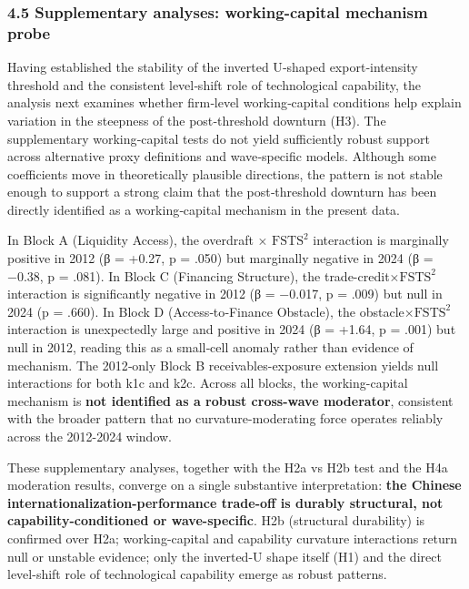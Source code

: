 \documentclass[12pt,a4paper]{article}
\begin{document}
\hypertarget{45-supplementary-analyses-working-capital-mechanism-probe}{%
\subsubsection{4.5 Supplementary analyses: working-capital mechanism
probe}\label{45-supplementary-analyses-working-capital-mechanism-probe}}

Having established the stability of the inverted U‑shaped
export‑intensity threshold and the consistent level‑shift role of
technological capability, the analysis next examines whether firm‑level
working‑capital conditions help explain variation in the steepness of
the post‑threshold downturn (H3). The supplementary working‑capital
tests do not yield sufficiently robust support across alternative proxy
definitions and wave‑specific models. Although some coefficients move in
theoretically plausible directions, the pattern is not stable enough to
support a strong claim that the post‑threshold downturn has been
directly identified as a working‑capital mechanism in the present data.

In Block A (Liquidity Access), the overdraft × \(\mathrm{FSTS}^2\)
interaction is marginally positive in 2012 (β = +0.27, p = .050) but
marginally negative in 2024 (β = −0.38, p = .081). In Block C (Financing
Structure), the trade-credit×\(\mathrm{FSTS}^2\) interaction is
significantly negative in 2012 (β = −0.017, p = .009) but null in 2024
(p = .660). In Block D (Access‑to‑Finance Obstacle), the
obstacle×\(\mathrm{FSTS}^2\) interaction is unexpectedly large and
positive in 2024 (β = +1.64, p = .001) but null in 2012, reading this as
a small‑cell anomaly rather than evidence of mechanism. The 2012‑only
Block B receivables-exposure extension yields null interactions for both
k1c and k2c. Across all blocks, the working-capital mechanism is
\textbf{not identified as a robust cross-wave moderator}, consistent
with the broader pattern that no curvature-moderating force operates
reliably across the 2012-2024 window.

These supplementary analyses, together with the H2a vs H2b test and the
H4a moderation results, converge on a single substantive interpretation:
\textbf{the Chinese internationalization-performance trade-off is
durably structural, not capability-conditioned or wave-specific}. H2b
(structural durability) is confirmed over H2a; working-capital and
capability curvature interactions return null or unstable evidence; only
the inverted-U shape itself (H1) and the direct level-shift role of
technological capability emerge as robust patterns.
\end{document}
